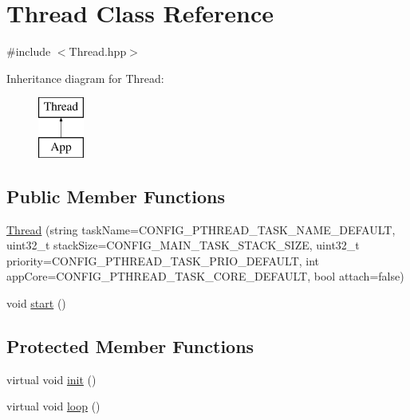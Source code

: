 \hypertarget{classThread}{}\section{Thread Class Reference}
\label{classThread}


{\ttfamily \#include $<$Thread.\+hpp$>$}

Inheritance diagram for Thread\+:\begin{figure}[H]
\begin{center}
\leavevmode
\includegraphics[height=2.000000cm]{classThread}
\end{center}
\end{figure}
\subsection*{Public Member Functions}
\begin{DoxyCompactItemize}
\item 
\mbox{\hyperlink{classThread_ab01de64e2e0ee9418b344036d4600cd3}{Thread}} (string task\+Name=C\+O\+N\+F\+I\+G\+\_\+\+P\+T\+H\+R\+E\+A\+D\+\_\+\+T\+A\+S\+K\+\_\+\+N\+A\+M\+E\+\_\+\+D\+E\+F\+A\+U\+LT, uint32\+\_\+t stack\+Size=C\+O\+N\+F\+I\+G\+\_\+\+M\+A\+I\+N\+\_\+\+T\+A\+S\+K\+\_\+\+S\+T\+A\+C\+K\+\_\+\+S\+I\+ZE, uint32\+\_\+t priority=C\+O\+N\+F\+I\+G\+\_\+\+P\+T\+H\+R\+E\+A\+D\+\_\+\+T\+A\+S\+K\+\_\+\+P\+R\+I\+O\+\_\+\+D\+E\+F\+A\+U\+LT, int app\+Core=C\+O\+N\+F\+I\+G\+\_\+\+P\+T\+H\+R\+E\+A\+D\+\_\+\+T\+A\+S\+K\+\_\+\+C\+O\+R\+E\+\_\+\+D\+E\+F\+A\+U\+LT, bool attach=false)
\item 
void \mbox{\hyperlink{classThread_a1f53ee62bd30a7924186ef26150ce262}{start}} ()
\end{DoxyCompactItemize}
\subsection*{Protected Member Functions}
\begin{DoxyCompactItemize}
\item 
virtual void \mbox{\hyperlink{classThread_a47884e3db0706dede4379b68e6d845b6}{init}} ()
\item 
virtual void \mbox{\hyperlink{classThread_ab1a2613851db5be41e35aaf3d7dd6ab1}{loop}} ()
\end{DoxyCompactItemize}


